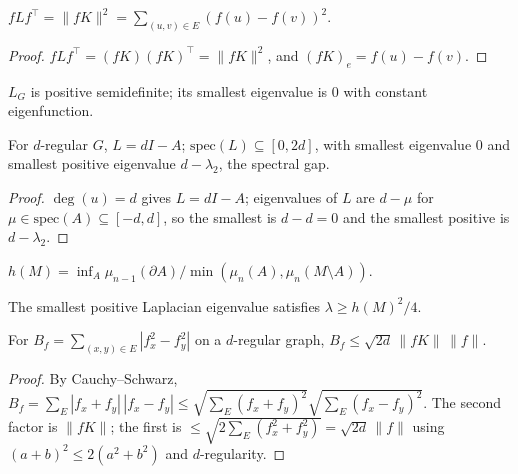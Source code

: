 \begin{lemma}
  \label{eq:laplacian-form}
  $fLf^\top=\|fK\|^2=\sum_{(u,v)\in E}(f(u)-f(v))^2$.
\end{lemma}
\begin{proof}
  $fLf^\top=(fK)(fK)^\top=\|fK\|^2$, and $(fK)_e=f(u)-f(v)$.
\end{proof}

\begin{proposition}
  \label{prop:laplacian-psd}
  \mathlibok
  $L_G$ is positive semidefinite; its smallest eigenvalue is $0$ with constant
  eigenfunction.
\end{proposition}

\begin{lemma}
  \label{lem:laplacian-regular}
  For $d$-regular $G$, $L=dI-A$; $\mathrm{spec}(L)\subseteq[0,2d]$, with smallest
  eigenvalue $0$ and smallest positive eigenvalue $d-\lambda_2$, the spectral
  gap.
\end{lemma}
\begin{proof}
  $\deg(u)=d$ gives $L=dI-A$; eigenvalues of $L$ are $d-\mu$ for $\mu\in
  \mathrm{spec}(A)\subseteq[-d,d]$, so the smallest is $d-d=0$ and the smallest
  positive is $d-\lambda_2$.
\end{proof}

\begin{definition}
  \label{def:cheeger-manifold}
  $h(M)=\inf_A\mu_{n-1}(\partial A)/\min(\mu_n(A),\mu_n(M\setminus A))$.
\end{definition}

\begin{theorem}
  \label{thm:cheeger-manifold}
  \notready
  The smallest positive Laplacian eigenvalue satisfies $\lambda\ge h(M)^2/4$.
\end{theorem}

\begin{lemma}
  \label{lem:Bf-upper}
  For $B_f=\sum_{(x,y)\in E}|f_x^2-f_y^2|$ on a $d$-regular graph,
  $B_f\le\sqrt{2d}\,\|fK\|\,\|f\|$.
\end{lemma}
\begin{proof}
  By Cauchy--Schwarz, $B_f=\sum_E|f_x+f_y|\,|f_x-f_y|
  \le\sqrt{\sum_E(f_x+f_y)^2}\sqrt{\sum_E(f_x-f_y)^2}$. The second factor is
  $\|fK\|$; the first is $\le\sqrt{2\sum_E(f_x^2+f_y^2)}=\sqrt{2d}\,\|f\|$ using
  $(a+b)^2\le2(a^2+b^2)$ and $d$-regularity.
\end{proof}

